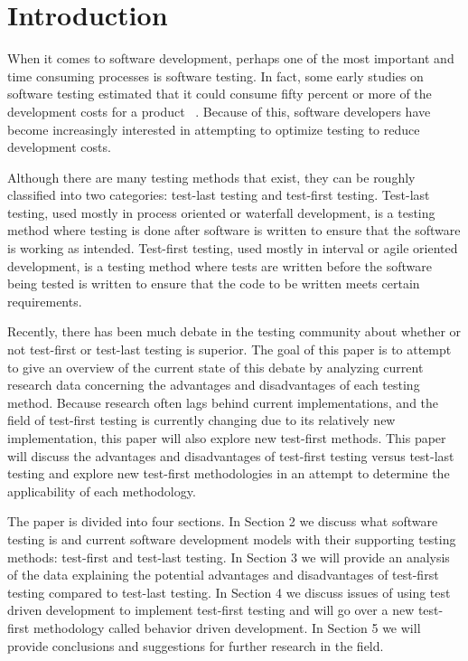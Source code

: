 \documentclass{sig-alternate}
\begin{document}
\section{Introduction}
When it comes to software development, perhaps one of the most important and time consuming processes is software testing.  In fact, some early studies on software testing estimated that it could consume fifty percent or more of the development costs for a product ~\cite{Bertolino:2007}.  Because of this, software developers have become increasingly interested in attempting to optimize testing to reduce development costs.

Although there are many testing methods that  exist, they can be roughly classified into two categories: test-last testing and test-first testing.  Test-last testing, used mostly in process oriented or waterfall development, is a testing method where testing is done after software is written to ensure that the software is working as intended.  Test-first testing, used mostly in interval or agile oriented development, is a testing method where tests are written before the software being tested is written to ensure that the code to be written meets certain requirements.

Recently, there has been much debate in the testing community about whether or not test-first or test-last testing is superior.  The goal of this paper is to attempt to give an overview of the current state of this debate by analyzing current research data concerning the advantages and disadvantages of each testing method.  Because research often lags behind current implementations, and the field of test-first testing is currently changing due to its relatively new implementation, this paper will also explore new test-first methods.  This paper will discuss the advantages and disadvantages of test-first testing versus test-last testing and explore new test-first methodologies in an attempt to determine the applicability of each methodology.

The paper is divided into four sections.  In Section 2 we discuss what software testing is and current software development models with their supporting testing methods: test-first and test-last testing.  In Section 3 we will provide an analysis of the data explaining the potential advantages and disadvantages of test-first testing compared to test-last testing.  In Section 4 we discuss issues of using test driven development to implement test-first testing and will go over a new test-first methodology called behavior driven development. In Section 5 we will provide conclusions and suggestions for further research in the field.
\end{document}

